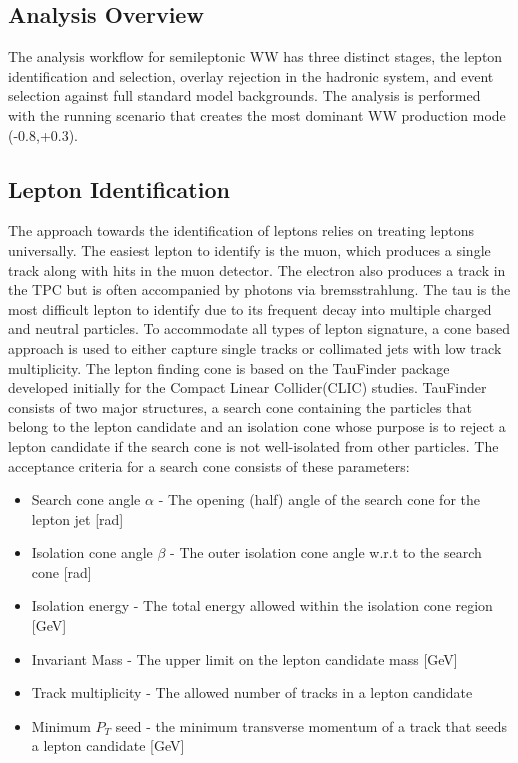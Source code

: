 \subsection{Analysis Overview}
\label{subsec:ana_overview}

The analysis workflow for semileptonic WW has three distinct stages, the lepton identification and selection, overlay rejection in the hadronic system, and event selection against full standard model backgrounds. The analysis is performed with the  running scenario that creates the most dominant WW production mode (-0.8,+0.3). 


\subsection{Lepton Identification}
\label{subsec:Lepton_ID}
The approach towards the identification of leptons relies on treating leptons universally. The easiest lepton to identify is the muon, which produces a single track along with hits in the muon detector. The electron also produces a track in the TPC but is often accompanied by photons via bremsstrahlung. The tau is the most difficult lepton to identify due to its frequent decay into multiple charged and neutral particles. To accommodate all types of lepton signature, a cone based approach is used to either capture single tracks or collimated jets with low track multiplicity. The lepton finding cone is based on the TauFinder package \cite{taufinder} developed initially for the Compact Linear Collider(CLIC) studies. TauFinder consists of two major structures, a search cone containing the particles that belong to the lepton candidate and an isolation cone whose purpose is to reject a lepton candidate if the search cone is not well-isolated from other particles. The acceptance criteria for a search cone consists of these parameters:
\begin{itemize}
\item Search cone angle $\alpha$ - The opening (half) angle of the search cone for the lepton jet [rad]
\item Isolation cone angle $\beta$ - The outer isolation cone angle w.r.t to the search cone [rad]
\item Isolation energy - The total energy allowed within the isolation cone region [GeV]
\item Invariant Mass - The upper limit on the lepton candidate mass [GeV]
\item Track multiplicity - The allowed number of tracks in a lepton candidate
\item Minimum $P_T$ seed - the minimum transverse momentum of a track that seeds a lepton candidate [GeV] 
\end{itemize}
